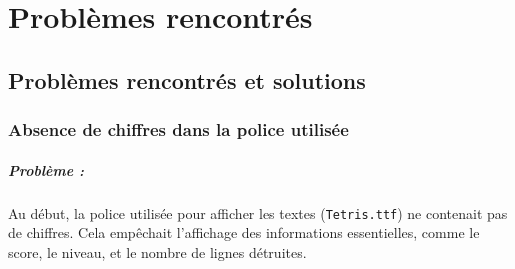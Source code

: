 \documentclass[12pt,a4paper]{report}
\begin{document}
\newpage



\chapter{Problèmes rencontrés}

\section{Problèmes rencontrés et solutions}

\subsection{Absence de chiffres dans la police utilisée}
\paragraph{Problème :} 
Au début, la police utilisée pour afficher les textes (\texttt{Tetris.ttf}) ne contenait pas de chiffres. Cela empêchait l’affichage des informations essentielles, comme le score, le niveau, et le nombre de lignes détruites.\\
\end{document}
